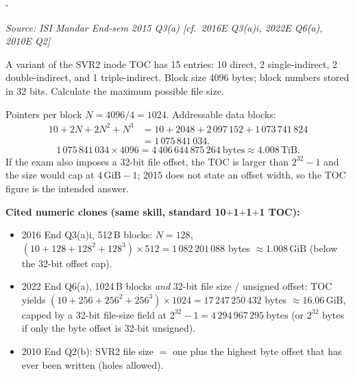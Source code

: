 \documentclass[11pt,a4paper]{article}
\makeatletter
\newcommand{\keepspace}[1]{\par\penalty-100\begingroup
  \setlength{\dimen@}{#1}\dimen@ii\pagegoal\advance\dimen@ii-\pagetotal
  \ifdim\dimen@>\dimen@ii\ifdim\dimen@ii>\z@\vfil\fi\break\fi\endgroup}
\newcounter{qn}[section]
\newenvironment{Qn}[4]{%
  \refstepcounter{qn}\keepspace{7\baselineskip}%
  \begin{tcolorbox}[qboxstyle, title={Q\thesection.\theqn\ \ [#1 \textbar\ #2]\ \ #4}]%
  {\footnotesize\color{g3}\textit{Source: #3}}\par\smallskip%
}{%
  \end{tcolorbox}%
}
\newenvironment{Sol}{%
  \begin{tcolorbox}[sboxstyle, title={Solution}]%
}{%
  \end{tcolorbox}\vspace{0.35em}%
}
\makeatother
\begin{document}
\begin{Qn}{Hard}{Lect 24}{ISI Mandar End-sem 2015 Q3(a) [cf.\ 2016E Q3(a)i, 2022E Q6(a), 2010E Q2]}{Max size with 10$+$2$+$2$+$1 TOC}
A variant of the SVR2 inode TOC has 15 entries: 10 direct, 2 single-indirect,
2 double-indirect, and 1 triple-indirect. Block size 4096 bytes; block
numbers stored in 32 bits. Calculate the maximum possible file size.
\end{Qn}
\begin{Sol}
Pointers per block $N = 4096/4 = 1024$. Addressable data blocks:
\begin{align*}
  10 + 2N + 2N^{2} + N^{3}
  &= 10 + 2048 + 2\,097\,152 + 1\,073\,741\,824 \\
  &= 1\,075\,841\,034.
\end{align*}
\[
  1\,075\,841\,034 \times 4096 = 4\,406\,644\,875\,264\ \text{bytes}
  \approx 4.008\,\mathrm{TiB}.
\]
If the exam also imposes a 32-bit file offset, the TOC is larger than
$2^{32}-1$ and the size would cap at $4\,\mathrm{GiB}-1$; 2015 does not
state an offset width, so the TOC figure is the intended answer.

\textbf{Cited numeric clones (same skill, standard 10$+$1$+$1$+$1 TOC):}
\begin{itemize}
\item 2016 End Q3(a)i, 512\,B blocks: $N=128$,
      $(10+128+128^{2}+128^{3})\times 512 = 1\,082\,201\,088$ bytes
      $\approx 1.008\,\mathrm{GiB}$ (below the 32-bit offset cap).
\item 2022 End Q6(a), 1024\,B blocks \emph{and} 32-bit file size /
      unsigned offset: TOC yields $(10+256+256^{2}+256^{3})\times 1024 =
      17\,247\,250\,432$ bytes $\approx 16.06\,\mathrm{GiB}$, capped by a
      32-bit file-size field at $2^{32}-1 = 4\,294\,967\,295\ \text{bytes}$
      (or $2^{32}$ bytes if only the byte offset is 32-bit unsigned).
\item 2010 End Q2(b): SVR2 file size $=$ one plus the highest byte
      offset that has ever been written (holes allowed).
\end{itemize}
\end{Sol}
\end{document}
